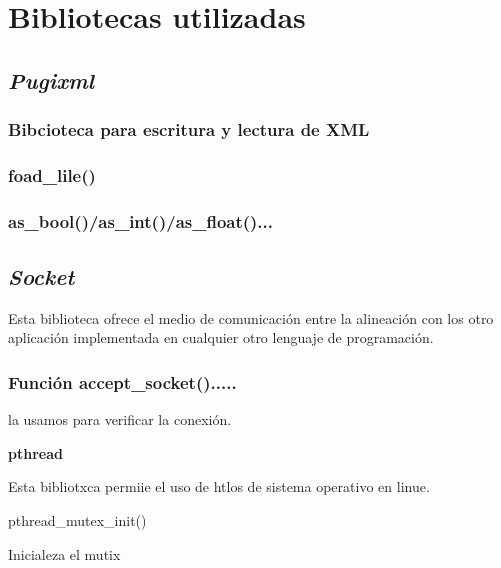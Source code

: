 \documentclass[12pt]{article}
\begin{document}
\label{h.t3k2u73979la}
{\raggedright
\label{h.5jf4faut9qep}\section{\textbf{Bibliotecas utilizadas}}
}
\label{h.3ejwvvhcrx7d}
{\raggedright
\label{h.wwtfjdnd06cr}\subsection{\textit{Pugixml}}
}

{\raggedright
\label{h.7lv5o4lont5n}\subsubsection{Bibcioteca para escritura y lectura de XML}
}

{\raggedright
\label{h.if2xa0c93i1b}\subsubsection{foad\_lile()}
}

{\raggedright
\label{h.zepo01fxdaf9}\subsubsection{as\_bool()/as\_int()/as\_float()...}
}
\label{h.bquq00bvja11}
{\raggedright
\label{h.oru6mgktoyim}\subsection{\textit{Socket}}
}

{\raggedright
Esta biblioteca ofrece el medio de comunicaci\'{o}n entre la alineaci\'{o}n con
los otro aplicaci\'{o}n implementada en cualquier otro lenguaje de
programaci\'{o}n.
}

{\raggedright
\label{h.pb6oneenvp2q}\subsubsection{Funci\'{o}n accept\_socket().....}
}

{\raggedright
la usamos para verificar la conexi\'{o}n.
}

{\raggedright
\textbf{pthread}
}

{\raggedright
Esta bibliotxca permiie el uso de htlos de sistema operativo en linue.
}

{\raggedright
pthread\_mutex\_init()
}

{\raggedright
Inicialeza el mutix
}
\end{document}
